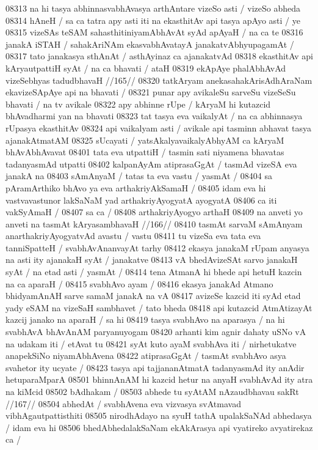 08313 na hi tasya abhinnasvabhAvasya arthAntare vizeSo asti / vizeSo abheda
08314 hAneH / sa ca tatra apy asti iti na ekasthitAv api tasya apAyo  asti / ye
08315 vizeSAs teSAM sahasthitiniyamAbhAvAt syAd apAyaH / na ca te  
08316 janakA iSTAH / sahakAriNAm ekasvabhAvatayA janakatvAbhyupagamAt /
08317 tato janakasya sthAnAt / asthAyinaz ca ajanakatvAd  
08318 ekasthitAv api kAryautpattiH syAt / na ca bhavati / ataH 
08319 	ekApAye phalAbhAvAd vizeSebhyas tadudbhavaH //165// 
08320 tatkAryam anekasahakArisAdhAraNam ekavizeSApAye api na bhavati /
08321 punar apy avikaleSu sarveSu vizeSeSu bhavati / na tv avikale  
08322 apy abhinne rUpe / kAryaM hi kutazcid bhAvadharmi yan na  bhavati  
08323 tat tasya eva vaikalyAt / na ca abhinnasya rUpasya ekasthitAv
08324 api vaikalyam asti / avikale api tasminn abhavat tasya ajanakAtmatAM  
08325 sUcayati / yatsAkalyavaikalyAbhyAM ca kAryaM bhAvAbhAvavat 
08401 tata eva utpattiH / tasmin sati niyamena bhavatas tadanyasmAd  utpatti 
08402 kalpanAyAm atiprasaGgAt / tasmAd vizeSA eva janakA na
08403 sAmAnyaM / tatas ta eva vastu / yasmAt / 
08404 	sa pAramArthiko bhAvo ya eva arthakriyAkSamaH /  
08405 idam eva hi vastvavastunor lakSaNaM yad arthakriyAyogyatA ayogyatA
08406 ca iti vakSyAmaH / 
08407 	sa ca / 
08408 arthakriyAyogyo arthaH  
08409 	na anveti yo anveti na tasmAt kAryasambhavaH //166//  
08410 tasmAt sarvaM sAmAnyam anarthakriyAyogyatvAd avastu / vastu
08411 tu vizeSa eva tata eva tanniSpatteH / svabhAvAnanvayAt tarhy
08412 ekasya janakaM rUpam anyasya na asti ity ajanakaH syAt / janakatve
08413 vA bhedAvizeSAt sarvo janakaH syAt / na etad asti / yasmAt /  
08414 	tena AtmanA hi bhede api hetuH kazcin na ca aparaH /
08415 	svabhAvo ayam / 
08416 ekasya janakAd Atmano bhidyamAnAH sarve samaM janakA na vA 
08417 avizeSe kazcid iti syAd etad yady eSAM na vizeSaH sambhavet / tato bheda
08418 api kutazcid AtmAtizayAt kazcij janako na aparaH / sa hi  
08419 tasya svabhAvo na aparasya / na hi svabhAvA bhAvAnAM  paryanuyogam  
08420 arhanti kim agnir dahaty uSNo vA na udakam iti / etAvat tu  
08421 syAt kuto ayaM svabhAva iti / nirhetukatve anapekSiNo niyamAbhAvena  
08422 atiprasaGgAt / tasmAt svabhAvo asya svahetor ity ucyate / 
08423 tasya api tajjananAtmatA tadanyasmAd ity anAdir hetuparaMparA
08501 bhinnAnAM hi kazcid hetur na anyaH svabhAvAd ity atra na kiMcid 
08502 bAdhakam /
08503 	abhede tu syAtAM nAzaudbhavau sakRt //167// 
08504 abhedAt / svabhAvena eva vizvasya svAtmavad vibhAgautpattisthiti  
08505 nirodhAdayo na syuH tathA upalakSaNAd abhedasya / idam eva hi  
08506 bhedAbhedalakSaNam ekAkArasya api vyatireko avyatirekaz ca / 
